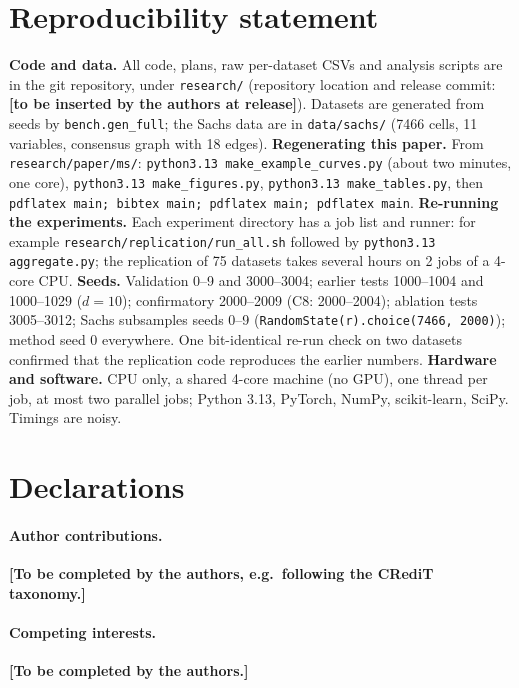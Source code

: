 \documentclass[11pt,a4paper]{article}
\newcommand{\placeholder}[1]{\textbf{[#1]}}
\begin{document}
\section*{Reproducibility statement}
\label{sec:repro}
\textbf{Code and data.} All code, plans, raw per-dataset CSVs and analysis scripts are in the git repository, under \texttt{research/} (repository location and release commit: \placeholder{to be inserted by the authors at release}). Datasets are generated from seeds by \texttt{bench.gen\_full}; the Sachs data are in \texttt{data/sachs/} (7466 cells, 11 variables, consensus graph with 18 edges). \textbf{Regenerating this paper.} From \texttt{research/paper/ms/}: \texttt{python3.13 make\_example\_curves.py} (about two minutes, one core), \texttt{python3.13 make\_figures.py}, \texttt{python3.13 make\_tables.py}, then \texttt{pdflatex main; bibtex main; pdflatex main; pdflatex main}. \textbf{Re-running the experiments.} Each experiment directory has a job list and runner: for example \texttt{research/replication/run\_all.sh} followed by \texttt{python3.13 aggregate.py}; the replication of 75 datasets takes several hours on 2 jobs of a 4-core CPU. \textbf{Seeds.} Validation 0--9 and 3000--3004; earlier tests 1000--1004 and 1000--1029 ($d=10$); confirmatory 2000--2009 (C8: 2000--2004); ablation tests 3005--3012; Sachs subsamples seeds 0--9 (\texttt{RandomState(r).choice(7466, 2000)}); method seed 0 everywhere. One bit-identical re-run check on two datasets confirmed that the replication code reproduces the earlier numbers. \textbf{Hardware and software.} CPU only, a shared 4-core machine (no GPU), one thread per job, at most two parallel jobs; Python 3.13, PyTorch, NumPy, scikit-learn, SciPy. Timings are noisy.

\section*{Declarations}
\paragraph{Author contributions.} \placeholder{To be completed by the authors, e.g.\ following the CRediT taxonomy.}
\paragraph{Competing interests.} \placeholder{To be completed by the authors.}
\end{document}
